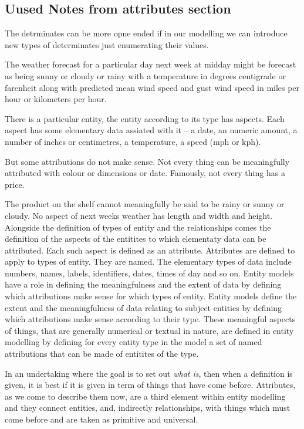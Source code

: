 \subsection{Uused Notes from attributes section}

The detrminates can be more opne ended if in our modelling we can introduce new 
types of determinates just enumerating their values. 


\mynote
The weather forecast for a particular day next week at midday 
might be forecast as being sunny or cloudy or rainy with a temperature in degrees 
centigrade or farenheit along with predicted mean wind speed and gust wind speed
in miles per hour or kilometers per hour.

\mynote There is a particular entity, the entity according to its type has aspects.
Each aspect has some elementary data assiated with it -- a date, an numeric amount, a number of inches or centimetres, a temperature, a speed (mph or kph). 

\mynote
But some attributions do not make sense. Not every thing can be meaningfully attributed with colour or dimensions or date. 
Famously, not every thing has a price. 

\mynote
The product on the shelf cannot meaningfully be said to be rainy or sunny or cloudy.
No aspect of next weeks weather has length and width and height. 
\mynote 
Alongside the definition of types of entity and the relationships 
comes the definition of the aspects of the entitites to which elementaty data
can be attributed. Each such aspect is defined as an attribute. Attributes are defined to apply to types of entity. They are named.  
The elementary types of data include numbers, names, labels, identifiers, dates, times of day and so on.   
\mynote 
Entity models have a role in defining the meaningfulness and the extent of data
 by defining which attributions make sense for which types of entity.
\mynote 
Entity models define the extent and the meaningfulness of data relating to subject entities by defining which attributions make sense according to their type.
\mynote
These meaningful aspects of things, that are generally numerical or textual in nature, 
are defined in entity modelling by defining for every entity type in the  model 
 a set of named attributions that can be made of entitites of the type. 


\mynote
In an undertaking where the goal is to set out \textit{what is}, then when a definition is given, it is best if it is given in term of things that have come before.  Attributes, as we come to describe them now, are a third element within entity modelling and they connect entities, and, indirectly relationships, 
with things  which must come before and are taken as primitive and universal. 

